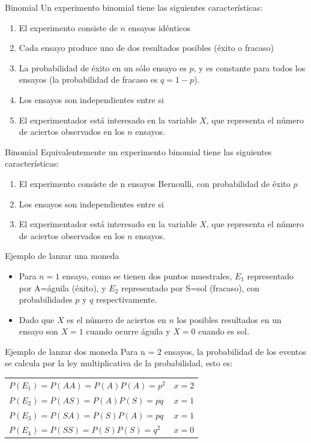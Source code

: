 \documentclass[11pt]{beamer}
\begin{document}
\begin{frame}{Binomial}
Un experimento binomial tiene las siguientes características:
\begin{enumerate}
\item El experimento consiste de $n$ ensayos idénticos
\item Cada ensayo produce uno de dos resultados posibles (éxito o fracaso)
\item La probabilidad de éxito en un sólo ensayo es $p$, y es constante para todos los ensayos (la probabilidad de fracaso es $q = 1 - p$).
\item Los ensayos son independientes entre si
\item El experimentador está interesado en la variable $X$, que representa el número de aciertos observados en los $n$ ensayos.

\end{enumerate}
\end{frame}
\begin{frame}{Binomial}
Equivalentemente un experimento binomial tiene las siguientes características:
\begin{enumerate}
\item El experimento consiste de n ensayos Bernoulli, con probabilidad de éxito $p$
\item Los ensayos son independientes entre si
\item El experimentador está interesado en la variable $X$, que representa el número de aciertos observados en los $n$ ensayos.
\end{enumerate}
\end{frame}
\begin{frame}{Ejemplo de lanzar una moneda}
\begin{itemize}
\item Para $n = 1$ ensayo, como se tienen dos puntos muestrales, $E_1$ representado por A=águila (éxito), y $E_2$ representado por S=sol (fracaso), con probabilidades $p$ y $q$ respectivamente.
\item Dado que $X$ es el número de aciertos en $n$ los posibles resultados en un ensayo son $X = 1$ cuando ocurre águila y $X = 0$ cuando es sol.
\end{itemize}
\end{frame}
\begin{frame}{Ejemplo de lanzar dos moneda}
Para n = 2 ensayos, la probabilidad de los eventos se calcula por la ley multiplicativa de la probabilidad, esto es:
\begin{center}
\begin{tabular}{ll}
$P(E_{1})=P(AA)=P(A)P(A)=p^{2}$\hspace{2cm}&$x=2$ \\ 
$P(E_{2})=P(AS)=P(A)P(S)=pq$&$x=1$ \\
$P(E_{3})=P(SA)=P(S)P(A)=pq$&$x=1$ \\
$P(E_{4})=P(SS)=P(S)P(S)=q^{2}$&$x=0$ \\

\end{tabular}
\end{center}
\end{frame}
\end{document}
